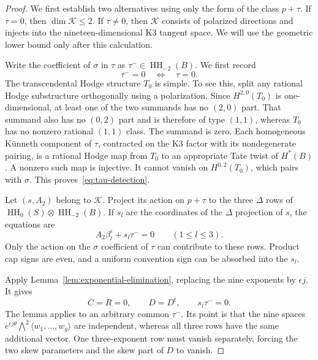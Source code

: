 \documentclass[11pt]{article}
\numberwithin{equation}{section}
\theoremstyle{definition}
\theoremstyle{remark}
\begin{document}
\begin{proof}
We first establish two alternatives using only the form of the
class $p+\tau$. If $\tau=0$, then $\dim\mathcal K\le2$.
If $\tau\ne0$, then $\mathcal K$ consists of polarized directions
and injects into the nineteen-dimensional K3 tangent space.
We will use the geometric lower bound only after this calculation.

Write the coefficient of $\sigma$ in $\tau$ as
$\tau^-\in\operatorname{HH}_{-2}(B)$. We first record
\begin{equation}\label{eq:tau-detection}
 \tau^-=0\quad\Longleftrightarrow\quad\tau=0.
\end{equation}
The transcendental Hodge structure $T_0$ is simple. To see this,
split any rational Hodge substructure orthogonally using a
polarization. Since $H^{2,0}(T_0)$ is one-dimensional, at least one
of the two summands has no $(2,0)$ part. That summand also has no
$(0,2)$ part and is therefore of type $(1,1)$, whereas $T_0$ has no
nonzero rational $(1,1)$ class. The summand is zero.
Each homogeneous K\"unneth component of $\tau$, contracted on the
K3 factor with its nondegenerate pairing, is a rational Hodge map
from $T_0$ to an appropriate Tate twist of $H^*(B)$. A nonzero such
map is injective. It cannot vanish on $H^{0,2}(T_0)$, which pairs
with $\sigma$. This proves~\eqref{eq:tau-detection}.

Let $(s,A_2)$ belong to $\mathcal K$. Project its action on $p+\tau$ to the
three $\Delta$ rows of
$\operatorname{HH}_0(S)\otimes\operatorname{HH}_{-2}(B)$. If $s_l$ are the coordinates of the
$\Delta$ projection of $s$, the equations are
\begin{equation}\label{eq:Delta-kernel-equations}
 A_2\beta_l^\epsilon+s_l\tau^-=0\qquad(1\le l\le3).
\end{equation}
Only the action on the $\sigma$ coefficient of $\tau$ can contribute
to these rows. Product cap signs are even, and a uniform convention
sign can be absorbed into the $s_l$.

Apply Lemma~\ref{lem:exponential-elimination}, replacing the nine
exponents by $\epsilon j$. It gives
\begin{equation}\label{eq:skew-vanishing}
 C=R=0,\qquad D=D^t,\qquad s_l\tau^-=0.
\end{equation}
The lemma applies to an arbitrary common $\tau^-$. Its point is that
the nine spaces
$e^{\epsilon j\theta}\bigwedge^2\langle w_1,\ldots,w_g\rangle$
are independent, whereas all three rows have the same additional
vector. One three-exponent row must vanish separately, forcing
the two skew parameters and the skew part of $D$ to vanish.


\end{proof}
\end{document}
